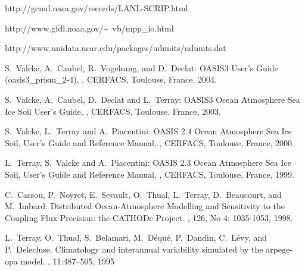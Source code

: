 \newpage
\begin{thebibliography}{10}

http://gcmd.nasa.gov/records/LANL-SCRIP.html

http://www.gfdl.noaa.gov/\~~vb/mpp\_io.html

http://www.unidata.ucar.edu/packages/udunits/udunits.dat

S.~Valcke, A.~Caubel, R.~Vogelsang, and D.~Declat:       
\newblock OASIS3 User's Guide (oasis3\_prism\_2-4),
, 
\newblock CERFACS, Toulouse, France, 2004.





S.~Valcke, A.~Caubel, D.~Declat and L.~Terray:        
\newblock OASIS3 Ocean Atmosphere Sea Ice Soil User's Guide,
, 
\newblock CERFACS, Toulouse, France, 2003.

S.~Valcke, L.~Terray and A.~Piacentini:
\newblock OASIS 2.4 Ocean Atmosphere Sea Ice Soil, User's Guide and
Reference Manual,
, 
\newblock CERFACS, Toulouse, France, 2000.

L.~Terray, S.~Valcke and A.~Piacentini:
\newblock OASIS 2.3 Ocean Atmosphere Sea Ice Soil, User's Guide and
Reference Manual,
, 
\newblock CERFACS, Toulouse, France, 1999.


C.~Cassou, P.~Noyret, E.~Sevault, O.~Thual, L.~Terray, D.~Beaucourt, and
  M.~Imbard:
\newblock Distributed Ocean-Atmosphere Modelling and Sensitivity to the
  Coupling Flux Precision: the CATHODe Project.
, 126, No 4: 1035-1053, 1998.

L.~Terray, O.~Thual, S.~Belamari, M.~D\'equ\'e, P.~Dandin, C.~L\'evy, and
P.~Delecluse. 
\newblock Climatology and interannual variability simulated by the arpege-opa
model. 
, 11:487--505, 1995


\end{thebibliography}
